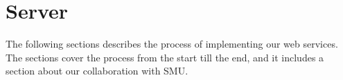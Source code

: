 \section{Server}
The following sections describes the process of implementing our web services. The sections cover the process from the start till the end, and it includes  a section about our collaboration with SMU.





